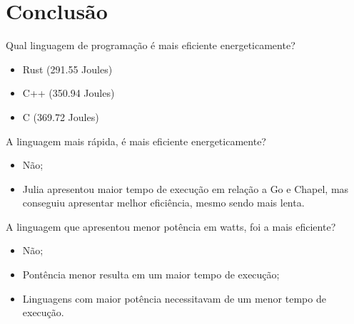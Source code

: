 \section{Conclusão}

\begin{frame}{Qual linguagem de programação é mais eficiente energeticamente?}
    \begin{itemize}
        \item Rust (291.55 Joules)
        \item C++ (350.94 Joules)
        \item C (369.72 Joules)
    \end{itemize}
\end{frame}

\begin{frame}{A linguagem mais rápida, é mais eficiente energeticamente?}
    \begin{itemize}
        \item Não;
        \item Julia apresentou maior tempo de execução em relação a Go e Chapel, mas conseguiu apresentar melhor eficiência, mesmo sendo mais lenta.
    \end{itemize}
\end{frame}

\begin{frame}{A linguagem que apresentou menor potência em watts, foi a mais eficiente?}
    \begin{itemize}
        \item Não;
        \item Pontência menor resulta em um maior tempo de execução;
        \item Linguagens com maior potência necessitavam de um menor tempo de execução.
    \end{itemize}
\end{frame}


